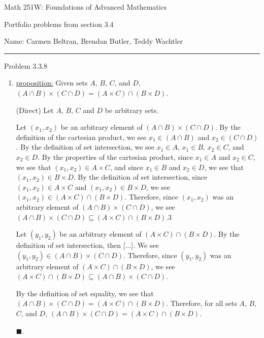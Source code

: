 \documentclass{article}
\theoremstyle{definition}
\renewcommand{\qed}{\blacksquare}
\begin{document}
	\begin{center}
		\Large{Math 251W: Foundations of Advanced Mathematics}

		\normalsize Portfolio problems from section 3.4

		\hfill Name: Carmen Beltran, Brendan Butler, Teddy Wachtler
		\hrule
		\vspace{0.4cm}
		\vspace{0.75cm}
	\end{center}


	\noindent Problem 3.3.8
	\vspace{0.3cm}

	\begin{enumerate}
		\item[v]
		\underline{proposition:}
		Given sets $A$, $B$, $C$, and $D$, $(A \cap B) \times (C \cap D) = (A \times C) \cap (B \times D)$.

		\vspace{.2cm}

		 (Direct)
		Let $A$, $B$, $C$ and $D$ be arbitrary sets.

		Let $(x_1, x_2)$ be an arbitrary element of $(A \cap B) \times (C \cap D)$.
		By the definition of the cartesian product, we see $x_1 \in (A \cap B)$ and $x_2 \in (C \cap D)$.
		By the definition of set intersection, we see $x_1 \in A$, $x_1 \in B$, $x_2 \in C$, and $x_2 \in D$.
		By the properties of the cartesian product, since $x_1 \in A$ and $x_2 \in C$, we see that $(x_1, x_2) \in A \times C$, and since $x_1 \in B$ and $x_2 \in D$, we see that $(x_1, x_2) \in B \times D$.
		By the definition of set intersection, since $(x_1, x_2) \in A \times C$ and $(x_1, x_2) \in B \times D$, we see $(x_1, x_2) \in (A \times C) \cap (B \times D)$.
		Therefore, since $(x_1, x_2)$ was an arbitrary element of $(A \cap B) \times (C \cap D)$, we see $(A \cap B) \times (C \cap D) \subseteq (A \times C) \cap (B \times D)$.3

		Let $(y_1, y_2)$ be an arbitrary element of $(A \times C) \cap (B \times D)$.
		By the definition of set intersection, then [...].
		We see $(y_1, y_2) \in (A \cap B) \times (C \cap D)$.
		Therefore, since $(y_1, y_2)$ was an arbitrary element of $(A \times C) \cap (B \times D)$, we see $(A \times C) \cap (B \times D) \subseteq (A \cap B) \times (C \cap D)$.

		By the definition of set equality, we see that $(A \cap B) \times (C \cap D) = (A \times C) \cap (B \times D)$.
		Therefore, for all sets $A$, $B$, $C$, and $D$, $(A \cap B) \times (C \cap D) = (A \times C) \cap (B \times D)$.

		$\qed$.

		\vspace{.2cm}
	\end{enumerate}
	\vspace{1cm}
\end{document}

